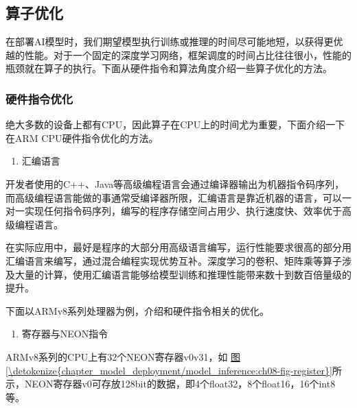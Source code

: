 \documentclass[letterpaper,10pt,english]{sphinxmanual}
\begin{document}
\subsection{算子优化}
\label{\detokenize{chapter_model_deployment/model_inference:ch08-sec-kernel-optimization}}\label{\detokenize{chapter_model_deployment/model_inference:id6}}
\sphinxAtStartPar
在部署AI模型时，我们期望模型执行训练或推理的时间尽可能地短，以获得更优越的性能。对于一个固定的深度学习网络，框架调度的时间占比往往很小，性能的瓶颈就在算子的执行。下面从硬件指令和算法角度介绍一些算子优化的方法。


\subsubsection{硬件指令优化}
\label{\detokenize{chapter_model_deployment/model_inference:id7}}
\sphinxAtStartPar
绝大多数的设备上都有CPU，因此算子在CPU上的时间尤为重要，下面介绍一下在ARM
CPU硬件指令优化的方法。
\begin{enumerate}
%
\item {} 
\sphinxAtStartPar
汇编语言

\end{enumerate}

\sphinxAtStartPar
开发者使用的C++、Java等高级编程语言会通过编译器输出为机器指令码序列，而高级编程语言能做的事通常受编译器所限，汇编语言是靠近机器的语言，可以一对一实现任何指令码序列，编写的程序存储空间占用少、执行速度快、效率优于高级编程语言。

\sphinxAtStartPar
在实际应用中，最好是程序的大部分用高级语言编写，运行性能要求很高的部分用汇编语言来编写，通过混合编程实现优势互补。深度学习的卷积、矩阵乘等算子涉及大量的计算，使用汇编语言能够给模型训练和推理性能带来数十到数百倍量级的提升。

\sphinxAtStartPar
下面以ARMv8系列处理器为例，介绍和硬件指令相关的优化。
\begin{enumerate}
%
\setcounter{enumi}{1}
\item {} 
\sphinxAtStartPar
寄存器与NEON指令

\end{enumerate}

\sphinxAtStartPar
ARMv8系列的CPU上有32个NEON寄存器v0\sphinxhyphen{}v31，如
\hyperref[\detokenize{chapter_model_deployment/model_inference:ch08-fig-register}]{图\ref{\detokenize{chapter_model_deployment/model_inference:ch08-fig-register}}}所示，NEON寄存器v0可存放128bit的数据，即4个float32，8个float16，16个int8等。
\end{document}
